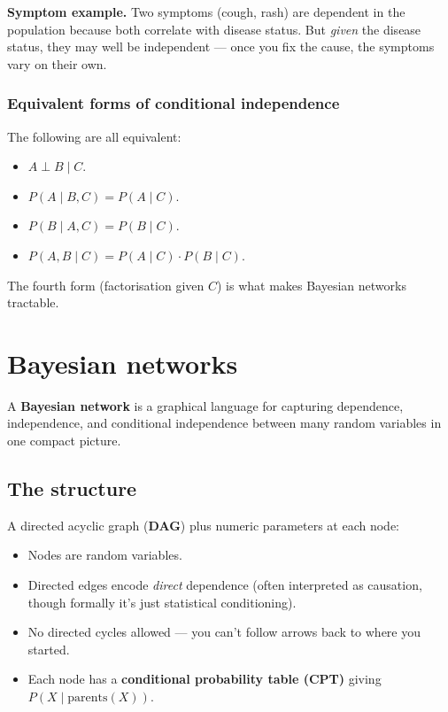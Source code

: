 \documentclass[11pt, a4paper]{article}
\begin{document}
\textbf{Symptom example.} Two symptoms (cough, rash) are dependent in the population because both correlate with disease status. But \emph{given} the disease status, they may well be independent — once you fix the cause, the symptoms vary on their own.

\subsubsection*{Equivalent forms of conditional independence}

The following are all equivalent:
\begin{itemize}
  \item $A \perp B \mid C$.
  \item $P(A \mid B, C) = P(A \mid C)$.
  \item $P(B \mid A, C) = P(B \mid C)$.
  \item $P(A, B \mid C) = P(A \mid C) \cdot P(B \mid C)$.
\end{itemize}

The fourth form (factorisation given $C$) is what makes Bayesian networks tractable.

\section{Bayesian networks}

A \textbf{Bayesian network} is a graphical language for capturing dependence, independence, and conditional independence between many random variables in one compact picture.

\subsection{The structure}

\begin{defbox}
A directed acyclic graph (\textbf{DAG}) plus numeric parameters at each node:
\begin{itemize}[itemsep=0pt, topsep=0pt]
  \item Nodes are random variables.
  \item Directed edges encode \emph{direct} dependence (often interpreted as causation, though formally it's just statistical conditioning).
  \item No directed cycles allowed — you can't follow arrows back to where you started.
  \item Each node has a \textbf{conditional probability table (CPT)} giving $P(X \mid \mathrm{parents}(X))$.
\end{itemize}
\end{defbox}
\end{document}
